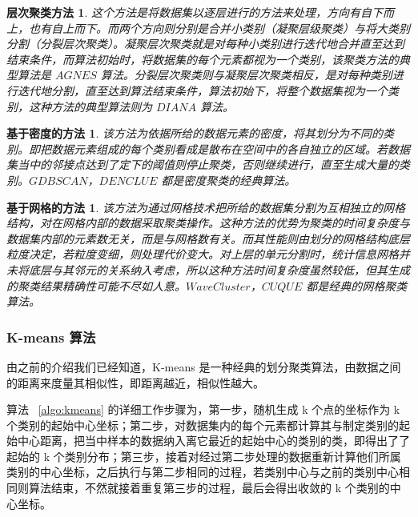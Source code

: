 \newtheorem*{cengcijuleifa}{层次聚类方法}
\begin{cengcijuleifa}
    这个方法是将数据集以逐层进行的方法来处理，方向有自下而上，也有自上而下。而两个方向则分别是合并小类别（凝聚层级聚类）与将大类别分割（分裂层次聚类）。凝聚层次聚类就是对每种小类别进行迭代地合并直至达到结束条件，而算法初始时，将数据集的每个元素都视为一个类别，该聚类方法的典型算法是 $AGNES$ 算法。分裂层次聚类则与凝聚层次聚类相反，是对每种类别进行迭代地分割，直至达到算法结束条件，算法初始下，将整个数据集视为一个类别，这种方法的典型算法则为 $DIANA$ 算法。
\end{cengcijuleifa}

\newtheorem*{midufa}{基于密度的方法}
\begin{midufa}
    该方法为依据所给的数据元素的密度，将其划分为不同的类别。即把数据元素组成的每个类别看成是散布在空间中的各自独立的区域。若数据集当中的邻接点达到了定下的阈值则停止聚类，否则继续进行，直至生成大量的类别。$GDBSCAN$，$DENCLUE$ 都是密度聚类的经典算法。
\end{midufa}

\newtheorem*{wanggefa}{基于网格的方法}
\begin{wanggefa}
    该方法为通过网格技术把所给的数据集分割为互相独立的网格结构，对在网格内部的数据采取聚类操作。这种方法的优势为聚类的时间复杂度与数据集内部的元素数无关，而是与网格数有关。而其性能则由划分的网格结构底层粒度决定，若粒度变细，则处理代价变大。对上层的单元分割时，统计信息网格并未将底层与其邻元的关系纳入考虑，所以这种方法时间复杂度虽然较低，但其生成的聚类结果精确性可能不尽如人意。$WaveCluster$，$CUQUE$ 都是经典的网格聚类算法。
\end{wanggefa}

\subsubsection{K-means 算法}
由之前的介绍我们已经知道，K-means 是一种经典的划分聚类算法，由数据之间的距离来度量其相似性，即距离越近，相似性越大。

算法 ~\ref{algo:kmeans} 的详细工作步骤为，第一步，随机生成 k 个点的坐标作为 k 个类别的起始中心坐标；第二步，对数据集内的每个元素都计算其与制定类别的起始中心距离，把当中样本的数据纳入离它最近的起始中心的类别的类，即得出了了起始的 k 个类别分布；第三步，接着对经过第二步处理的数据重新计算他们所属类别的中心坐标，之后执行与第二步相同的过程，若类别中心与之前的类别中心相同则算法结束，不然就接着重复第三步的过程，最后会得出收敛的 k 个类别的中心坐标。

